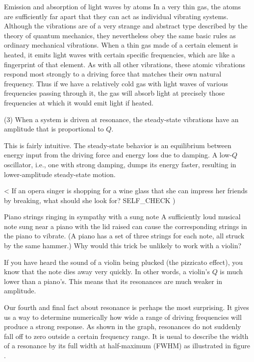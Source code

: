 \begin{eg}{Emission and absorption of light waves by atoms}
In a very thin gas, the atoms are sufficiently far apart
that they can act as individual vibrating systems. Although
the vibrations are of a very strange and abstract type
described by the theory of quantum mechanics, they
nevertheless obey the same basic rules as ordinary
mechanical vibrations. When a thin gas made of a certain
element is heated, it emits light waves with certain
specific frequencies, which are like a fingerprint of that
element. As with all other vibrations, these atomic
vibrations respond most strongly to a driving force that
matches their own natural frequency. Thus if we have a
relatively cold gas with light waves of various frequencies
passing through it, the gas will absorb light at precisely
those frequencies at which it would emit light if heated.
\end{eg}

\begin{important}
(3) When a system is driven at resonance, the steady-state
vibrations have an amplitude that is proportional to $Q$.
\end{important}

This is fairly intuitive. The steady-state behavior is an
equilibrium between energy input from the driving force and
energy loss due to damping. A low-$Q$ oscillator, i.e., one
with strong damping, dumps its energy faster, resulting in
lower-amplitude steady-state motion.

<%
If an opera singer is shopping for a wine glass that she can
impress her friends by breaking, what should she look for?
  SELF_CHECK
  ) %

\begin{eg}{Piano strings ringing in sympathy with a sung note}
\egquestion A sufficiently loud musical note sung near a piano
with the lid raised can cause the corresponding strings in
the piano to vibrate. (A piano has a set of three strings
for each note, all struck by the same hammer.) Why would
this trick be unlikely to work with a violin?

\eganswer If you have heard the sound of a violin being
plucked (the pizzicato effect), you know that the note dies
away very quickly. In other words, a violin's $Q$ is much
lower than a piano's. This means that its resonances are
much weaker in amplitude.
\end{eg}

Our fourth and final fact about resonance is perhaps the
most surprising. It gives us a way to determine numerically
how wide a range of driving frequencies will produce a
strong response. As shown in the graph, resonances do not
suddenly fall off to zero outside a certain frequency range.
It is usual to describe the width of a resonance by its full
width at half-maximum (FWHM) as illustrated 
in figure .\label{fwhm}

